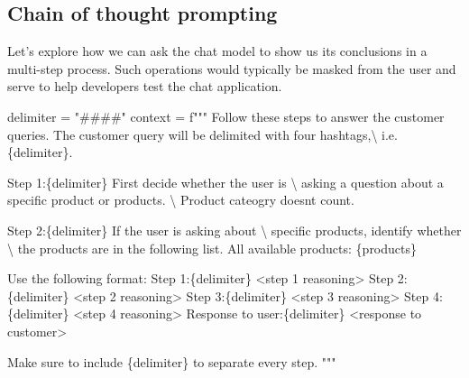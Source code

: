 \documentclass[
  letterpaper,
  DIV=11,
  numbers=noendperiod]{scrreprt}
\newenvironment{Shaded}{\begin{snugshade}}{\end{snugshade}}
\newcommand{\CharTok}[1]{\textcolor[rgb]{0.13,0.47,0.30}{#1}}
\newcommand{\NormalTok}[1]{\textcolor[rgb]{0.00,0.23,0.31}{#1}}
\newcommand{\OperatorTok}[1]{\textcolor[rgb]{0.37,0.37,0.37}{#1}}
\newcommand{\SpecialCharTok}[1]{\textcolor[rgb]{0.37,0.37,0.37}{#1}}
\newcommand{\SpecialStringTok}[1]{\textcolor[rgb]{0.13,0.47,0.30}{#1}}
\newcommand{\StringTok}[1]{\textcolor[rgb]{0.13,0.47,0.30}{#1}}
\begin{document}
\hypertarget{chain-of-thought-prompting}{%
\subsection{Chain of thought
prompting}\label{chain-of-thought-prompting}}

Let's explore how we can ask the chat model to show us its conclusions
in a multi-step process. Such operations would typically be masked from
the user and serve to help developers test the chat application.

\begin{Shaded}
\begin{Highlighting}[]
\NormalTok{delimiter }\OperatorTok{=} \StringTok{"\#\#\#\#"}
\NormalTok{context }\OperatorTok{=} \SpecialStringTok{f"""}
\SpecialStringTok{Follow these steps to answer the customer queries.}
\SpecialStringTok{The customer query will be delimited with four hashtags,}\CharTok{\textbackslash{}}
\SpecialStringTok{i.e. }\SpecialCharTok{\{}\NormalTok{delimiter}\SpecialCharTok{\}}\SpecialStringTok{.}

\SpecialStringTok{Step 1:}\SpecialCharTok{\{}\NormalTok{delimiter}\SpecialCharTok{\}}\SpecialStringTok{ First decide whether the user is }\CharTok{\textbackslash{}}
\SpecialStringTok{asking a question about a specific product or products. }\CharTok{\textbackslash{}}
\SpecialStringTok{Product cateogry doesn\textquotesingle{}t count.}

\SpecialStringTok{Step 2:}\SpecialCharTok{\{}\NormalTok{delimiter}\SpecialCharTok{\}}\SpecialStringTok{ If the user is asking about }\CharTok{\textbackslash{}}
\SpecialStringTok{specific products, identify whether }\CharTok{\textbackslash{}}
\SpecialStringTok{the products are in the following list.}
\SpecialStringTok{All available products:}
\SpecialCharTok{\{}\NormalTok{products}\SpecialCharTok{\}}

\SpecialStringTok{Use the following format:}
\SpecialStringTok{Step 1:}\SpecialCharTok{\{}\NormalTok{delimiter}\SpecialCharTok{\}}\SpecialStringTok{ \textless{}step 1 reasoning\textgreater{}}
\SpecialStringTok{Step 2:}\SpecialCharTok{\{}\NormalTok{delimiter}\SpecialCharTok{\}}\SpecialStringTok{ \textless{}step 2 reasoning\textgreater{}}
\SpecialStringTok{Step 3:}\SpecialCharTok{\{}\NormalTok{delimiter}\SpecialCharTok{\}}\SpecialStringTok{ \textless{}step 3 reasoning\textgreater{}}
\SpecialStringTok{Step 4:}\SpecialCharTok{\{}\NormalTok{delimiter}\SpecialCharTok{\}}\SpecialStringTok{ \textless{}step 4 reasoning\textgreater{}}
\SpecialStringTok{Response to user:}\SpecialCharTok{\{}\NormalTok{delimiter}\SpecialCharTok{\}}\SpecialStringTok{ \textless{}response to customer\textgreater{}}

\SpecialStringTok{Make sure to include }\SpecialCharTok{\{}\NormalTok{delimiter}\SpecialCharTok{\}}\SpecialStringTok{ to separate every step.}
\SpecialStringTok{"""}
\end{Highlighting}
\end{Shaded}
\end{document}

